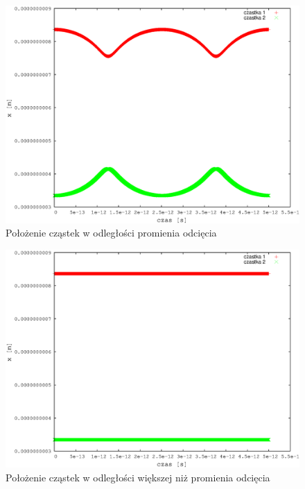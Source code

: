 \documentclass[a4paper,10pt]{article}
\begin{document}
\begin{figure}[h]
\begin{center}
\includegraphics[scale=0.6]{wyniki/verlet-radius-in.eps}
\caption{Położenie cząstek w odległości promienia odcięcia}
\label{pic:verlet-radius-in}
\end{center}
\end{figure}
\FloatBarrier

\begin{figure}[h]
\begin{center}
\includegraphics[scale=0.6]{wyniki/verlet-radius-out.eps}
\caption{Położenie cząstek w odległości większej niż promienia odcięcia}
\label{pic:verlet-radius-out}
\end{center}
\end{figure}
\FloatBarrier
\end{document}
